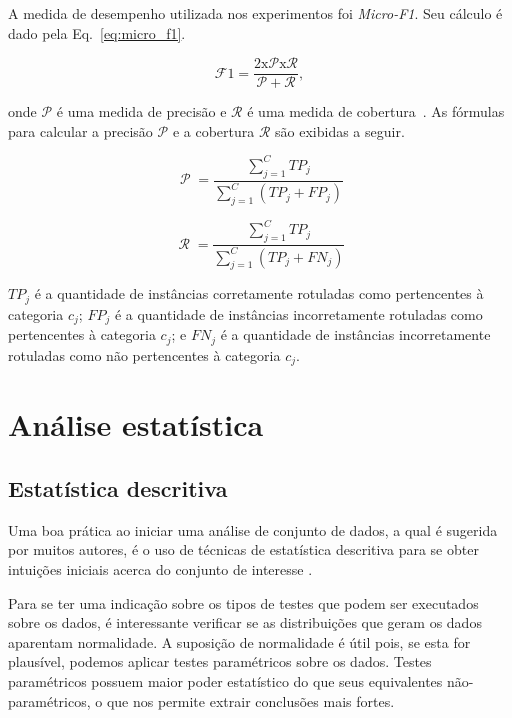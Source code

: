 \documentclass[conference]{IEEEtran}
\begin{document}
A medida de desempenho utilizada nos experimentos foi \textit{Micro-F1}.
Seu cálculo é dado pela Eq.~\ref{eq:micro_f1}.

\begin{equation}
\operatorname{\mathcal{F}{1} = \frac{2 x \mathcal{P} x \mathcal{R}}{\mathcal{P} + \mathcal{R}}},
\label{eq:micro_f1}
\end{equation}

\noindent onde $\mathcal{P}$ é uma medida de precisão e $\mathcal{R}$ é uma medida de cobertura~\cite{chang2008multilabel}. As fórmulas para calcular a precisão $\mathcal{P}$ e a cobertura $\mathcal{R}$ são exibidas a seguir.

\begin{equation}
\operatorname{\mathcal{P}} = \frac{\sum_{j=1}^{C}TP_j}{\sum_{j=1}^{C}(TP_j + FP_j)}
\label{eq:precision}
\end{equation}

\begin{equation}
\operatorname{\mathcal{R}} = \frac{\sum_{j=1}^{C}TP_j}{\sum_{j=1}^{C}(TP_j + FN_j)}
\label{eq:recall}
\end{equation}

$TP_j$ é a quantidade de instâncias corretamente rotuladas como pertencentes à categoria $c_j$; $FP_j$ é a quantidade de instâncias incorretamente rotuladas como pertencentes à categoria $c_j$; e $FN_j$ é a quantidade de instâncias incorretamente rotuladas como não pertencentes à categoria $c_j$. 

\section{Análise estatística}
\label{sec:analise}

\subsection{Estatística descritiva}
\label{sec:estat_descr}

Uma boa prática ao iniciar uma análise de conjunto de dados, a qual é sugerida por muitos autores, é o uso de técnicas de estatística descritiva para se obter intuições iniciais acerca do conjunto de interesse \cite{montgomery2010applied}.

Para se ter uma indicação sobre os tipos de testes que podem ser executados sobre os dados, é interessante verificar se as distribuições que geram os dados aparentam normalidade.
A suposição de normalidade é útil pois, se esta for plausível, podemos aplicar testes paramétricos sobre os dados.
Testes paramétricos possuem maior poder estatístico do que seus equivalentes não-paramétricos, o que nos permite extrair conclusões mais fortes.
\end{document}
